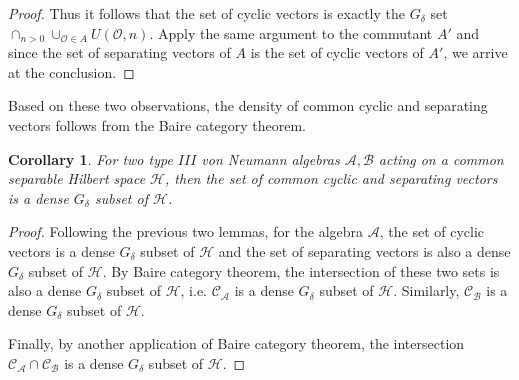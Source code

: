 \documentclass[a4paper,11pt]{article}
\newtheorem{corollary}[theorem]{Corollary}
\theoremstyle{definition}
\newtheorem{definition}{Definition}[section]
\begin{document}
\begin{proof}
    Thus it follows that the set of cyclic vectors is exactly the $G_\delta$ set $\cap_{n >0}\cup_{\mathcal{O}\in A}U(\mathcal{O},n)$. Apply the same argument to the commutant $A'$ and since the set of separating vectors of $A$ is the set of cyclic vectors of $A'$, we arrive at the conclusion.
\end{proof}
Based on these two observations, the density of common cyclic and separating vectors follows from the Baire category theorem. 
\begin{corollary}
    For two type $III$ von Neumann algebras $\mathcal{A}, \mathcal{B}$ acting on a common separable Hilbert space $\mathcal{H}$, then the set of common cyclic and separating vectors is a dense $G_\delta$ subset of $\mathcal{H}$.
\end{corollary}
\begin{proof}
    Following the previous two lemmas, for the algebra $\mathcal{A}$, the set of cyclic vectors is a dense $G_\delta$ subset of $\mathcal{H}$ and the set of separating vectors is also a dense $G_\delta$ subset of $\mathcal{H}$. By Baire category theorem, the intersection of these two sets is also a dense $G_\delta$ subset of $\mathcal{H}$, i.e. $\mathcal{C}_\mathcal{A}$ is a dense $G_\delta$ subset of $\mathcal{H}$. Similarly, $\mathcal{C}_\mathcal{B}$ is a dense $G_\delta$ subset of $\mathcal{H}$.

    Finally, by another application of Baire category theorem, the intersection $\mathcal{C}_\mathcal{A}\cap\mathcal{C}_\mathcal{B}$ is a dense $G_\delta$ subset of $\mathcal{H}$.
\end{proof}

\end{document}
